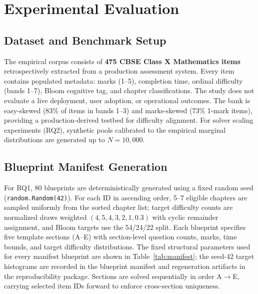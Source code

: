 \documentclass[runningheads]{llncs}
\begin{document}
\section{Experimental Evaluation}
\label{sec:experiments}

\subsection{Dataset and Benchmark Setup}
The empirical corpus consists of \textbf{475 CBSE Class X Mathematics items} retrospectively extracted from a production assessment system. Every item contains populated metadata: marks (1--5), completion time, ordinal difficulty (bands 1--7), Bloom cognitive tag, and chapter classifications. The study does not evaluate a live deployment, user adoption, or operational outcomes. The bank is easy-skewed (83\% of items in bands 1--3) and marks-skewed (73\% 1-mark items), providing a production-derived testbed for difficulty alignment. For solver scaling experiments (RQ2), synthetic pools calibrated to the empirical marginal distributions are generated up to $N{=}10{,}000$.

\subsection{Blueprint Manifest Generation}
For RQ1, 80 blueprints are deterministically generated using a fixed random seed (\texttt{random.Random(42)}). For each ID in ascending order, 5--7 eligible chapters are sampled uniformly from the sorted chapter list; target difficulty counts are normalized draws weighted $(4,5,4,3,2,1,0.3)$ with cyclic remainder assignment, and Bloom targets use the 54/24/22 split. Each blueprint specifies five template sections (A--E) with section-level question counts, marks, time bounds, and target difficulty distributions. The fixed structural parameters used for every manifest blueprint are shown in Table~\ref{tab:manifest}; the seed-42 target histograms are recorded in the blueprint manifest and regeneration artifacts in the reproducibility package. Sections are solved sequentially in order A$\to$E, carrying selected item IDs forward to enforce cross-section uniqueness.
\end{document}
